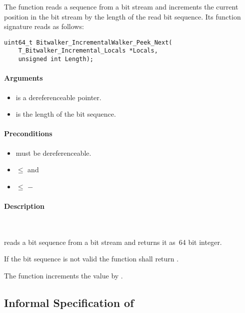 The function \peeknext reads a sequence from a bit stream 
and increments the current position in the bit stream by the 
length of the read bit sequence.
Its function signature reads as follows:\\[1em]


\begin{lstlisting}[style=acsl-block]
uint64_t Bitwalker_IncrementalWalker_Peek_Next(
    T_Bitwalker_Incremental_Locals *Locals,
    unsigned int Length);
\end{lstlisting}


\paragraph{Arguments}
\begin{itemize}
   \item  {} is a dereferenceable pointer.
   \item {} is the length of the bit sequence.
\end{itemize}

\paragraph{Preconditions}
\begin{itemize}
    \item  {} must be dereferenceable.
    \item {} $\leq$  and
    \item {} $\leq$  $-$ 
\end{itemize}

\paragraph{Description}~

\peeknext reads a bit sequence from a bit stream and returns it as~64 bit integer.


If the bit sequence is not valid the function shall return .

The function increments the value  by .


\clearpage

\subsection{Informal Specification of }


